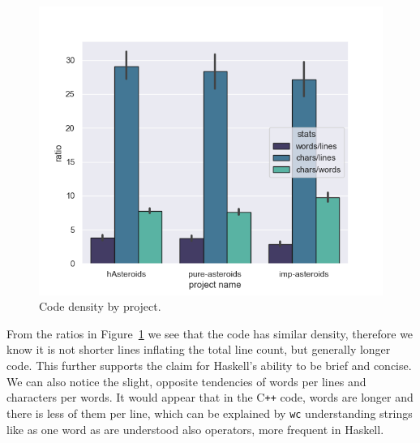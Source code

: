 \documentclass[
  digital, %
  color,   %
  table,   %
  oneside, %
  lof,     %
  lot,     %
]{fithesis3}
\newcommand{\cpp}{C\nolinebreak\texttt{+}\nolinebreak\texttt{+}}
\newcommand{\vs}{vs.\ }
\begin{document}
{\begin{figure}
    \centering
    \includegraphics[width=\textwidth]{images/lwc_density_by_project.png}
    \caption{Code density by project.}
    \label{fig:codedensity}
\end{figure}

From the ratios in Figure~\ref{fig:codedensity} we see that the code has similar density,
therefore we know it is not shorter lines inflating the total line count, but generally longer code.
This further supports the claim for Haskell's ability to be brief and concise.
We can also notice the slight, opposite tendencies of words per lines and characters per words.
It would appear that in the \cpp{} code, words are longer and there is less of them per line,
which can be explained by \texttt{wc} understanding strings like
 as one word as are understood also operators, more frequent in Haskell.





}
\end{document}
